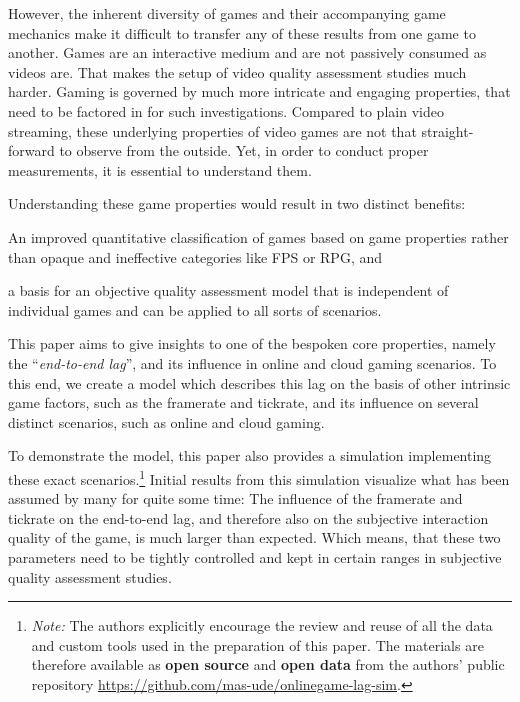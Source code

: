 However, the inherent diversity of games and their accompanying 
game mechanics make it difficult to transfer any of these results 
from one game to another. Games are an interactive medium and are 
not passively consumed as videos are. That makes the setup of video 
quality assessment studies much harder. Gaming is governed by much 
more intricate and engaging properties, that need to be factored in 
for such investigations. Compared to plain video streaming, these 
underlying properties of video games are not that straight-forward 
to observe from the outside. Yet, in order to conduct proper 
measurements, it is essential to understand them.

Understanding these game properties would result in two distinct benefits:
\begin{enumerate*}
	\item An improved quantitative classification of games based on game properties rather than opaque and ineffective categories like \gls{FPS} or \gls{RPG}, and
	\item a basis for an objective quality assessment model that is independent of individual games and can be applied to all sorts of scenarios.
\end{enumerate*}

This paper aims to give insights to one of the bespoken core properties, namely the ``\textit{end-to-end lag}'', and its influence in online and cloud gaming scenarios. To this end, we create a model which describes this lag on the basis of other intrinsic game factors, such as the framerate and tickrate, and its influence on several distinct scenarios, such as online and cloud gaming.

To demonstrate the model, this paper also provides a simulation implementing these exact scenarios.\footnote{\textit{Note:} The authors explicitly encourage the review and reuse of all the data and custom tools used in the preparation of this paper. The materials are therefore available as \textbf{open source} and \textbf{open data} from the authors' public repository  %
\url{https://github.com/mas-ude/onlinegame-lag-sim}.}
Initial results from this simulation visualize what has been assumed by many for quite some time: The influence of the framerate and tickrate on the end-to-end lag, and therefore also on the subjective interaction quality of the game, is much larger than expected. Which means, that these two parameters need to be tightly controlled and kept in certain ranges %
in subjective quality assessment studies.

